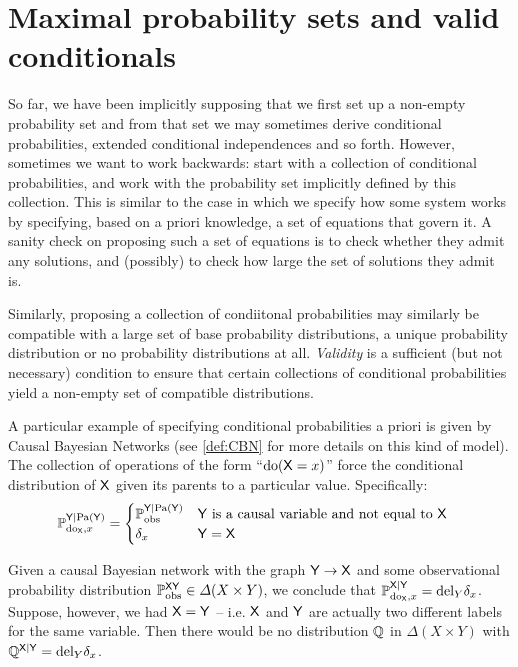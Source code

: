\section{Maximal probability sets and valid conditionals}\label{sec:validity}

So far, we have been implicitly supposing that we first set up a non-empty probability set and from that set we may sometimes derive conditional probabilities, extended conditional independences and so forth. However, sometimes we want to work backwards: start with a collection of conditional probabilities, and work with the probability set implicitly defined by this collection. This is similar to the case in which we specify how some system works by specifying, based on a priori knowledge, a set of equations that govern it. A sanity check on proposing such a set of equations is to check whether they admit any solutions, and (possibly) to check how large the set of solutions they admit is.

Similarly, proposing a collection of condiitonal probabilities may similarly be compatible with a large set of base probability distributions, a unique probability distribution or no probability distributions at all. \emph{Validity} is a sufficient (but not necessary) condition to ensure that certain collections of conditional probabilities yield a non-empty set of compatible distributions.

A particular example of specifying conditional probabilities a priori is given by Causal Bayesian Networks (see \ref{def:CBN} for more details on this kind of model). The collection of operations of the form ``$\mathrm{do}(\mathsf{X}=x)$'' force the conditional distribution of $\mathsf{X}$ given its parents to a particular value. Specifically:
\begin{align}
	\mathbb{P}_{\mathrm{do}_{\mathsf{X}},x}^{\mathsf{Y}|\mathrm{Pa}(\mathsf{Y})} &= \begin{cases}
	\mathbb{P}_{\mathrm{obs}}^{\mathsf{Y}|\mathrm{Pa}(\mathsf{Y})}&\mathsf{Y}\text{ is a causal variable and not equal to }\mathsf{X}\\
	\delta_x & \mathsf{Y}=\mathsf{X}
	\end{cases}
\end{align}

Given a causal Bayesian network with the graph $\mathsf{Y}\rightarrow \mathsf{X}$ and some observational probability distribution $\mathbb{P}_{\mathrm{obs}}^{\mathsf{XY}}\in\Delta(X\times Y)$, we conclude that $\mathbb{P}_{\mathrm{do}_{\mathsf{X}},x}^{\mathsf{X}|\mathsf{Y}}=\text{del}_Y \delta_x$. Suppose, however, we had $\mathsf{X}=\mathsf{Y}$ -- i.e. $\mathsf{X}$ and $\mathsf{Y}$ are actually two different labels for the same variable. Then there would be no distribution $\mathbb{Q}$ in $\Delta(X\times Y)$ with $\mathbb{Q}^{\mathsf{X}|\mathsf{Y}}=\text{del}_Y \delta_x$.

